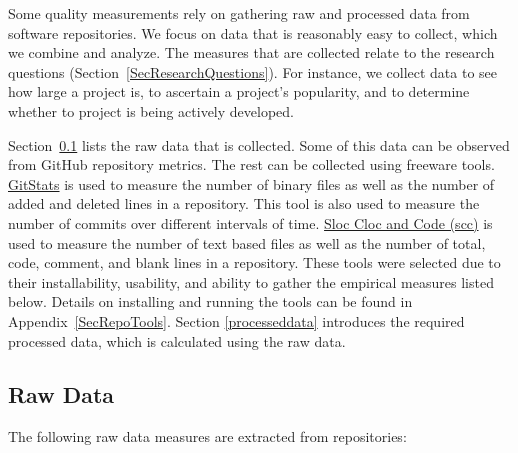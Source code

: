 \documentclass[letterpaper,cleveref]{lipics-v2019}
\begin{document}
Some quality measurements rely on gathering raw and processed data from software
repositories. We focus on data that is reasonably easy to collect, which we
combine and analyze. The measures that are collected relate to the research
questions (Section~\ref{SecResearchQuestions}). For instance, we collect data to
see how large a project is, to ascertain a project’s popularity, and to
determine whether to project is being actively developed.

Section~\ref{rawdata} lists the raw data that is collected.  Some of this data
can be observed from GitHub repository metrics. The rest can be collected using
freeware tools. \href{https://github.com/tomgi/git_stats}{GitStats} is used to
measure the number of binary files as well as the number of added and deleted
lines in a repository. This tool is also used to measure the number of commits
over different intervals of time. \href{https://github.com/boyter/scc}{Sloc Cloc
and Code (scc)} is used to measure the number of text based files as well as the
number of total, code, comment, and blank lines in a repository. These tools
were selected due to their installability, usability, and ability to gather the
empirical measures listed below. Details on installing and running the tools can
be found in Appendix~\ref{SecRepoTools}.  Section \ref{processeddata} introduces
the required processed data, which is calculated using the raw data.

\subsection{Raw Data}\label{rawdata}

The following raw data measures are extracted from repositories:
\end{document}
